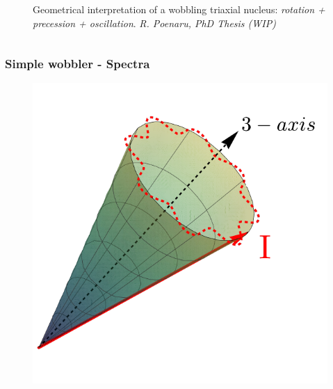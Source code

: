 \documentclass[
	11pt, %
]{beamer}
\begin{document}
\begin{frame}
\begin{columns}
\begin{column}{0.4\textwidth}
\begin{figure}
					\vspace{-0.7cm}
					\caption{Geometrical interpretation of a wobbling triaxial nucleus: \emph{rotation + precession + oscillation}. \emph{R. Poenaru, PhD Thesis (WIP)}}
				\end{figure}
			\end{column}
		\end{columns}
\end{frame}

\begin{frame}
	\frametitle{Simple wobbler - Spectra}
	\vspace{-0.2cm}
	\begin{figure}
		\centering
		\includegraphics[scale=0.33]{figures/precessional_cone_2.pdf}

\end{figure}
\end{frame}
\end{document}

